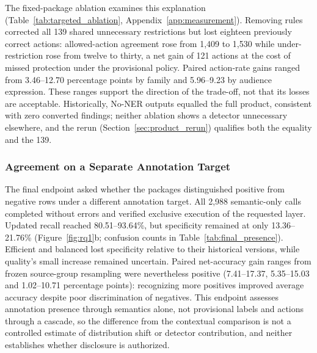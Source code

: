 \documentclass[sigconf]{acmart}
\theoremstyle{acmdefinition}\newtheorem{property}{Property}
\begin{document}
\label{sec:detector_ablation}
The fixed-package ablation examines this explanation (Table~\ref{tab:targeted_ablation}, Appendix~\ref{app:measurement}). Removing rules corrected all 139 shared unnecessary restrictions but lost eighteen previously correct actions: allowed-action agreement rose from 1,409 to 1,530 while under-restriction rose from twelve to thirty, a net gain of 121 actions at the cost of missed protection under the provisional policy. Paired action-rate gains ranged from 3.46--12.70 percentage points by family and 5.96--9.23 by audience expression. These ranges support the direction of the trade-off, not that its losses are acceptable. Historically, No-NER outputs equalled the full product, consistent with zero converted findings; neither ablation shows a detector unnecessary elsewhere, and the rerun (Section~\ref{sec:product_rerun}) qualifies both the equality and the 139.

\subsubsection{Agreement on a Separate Annotation Target}
\label{sec:final_annotation}
The final endpoint asked whether the packages distinguished positive from negative rows under a different annotation target. All 2,988 semantic-only calls completed without errors and verified exclusive execution of the requested layer. Updated recall reached 80.51--93.64\%, but specificity remained at only 13.36--21.76\% (Figure~\ref{fig:rq1}b; confusion counts in Table~\ref{tab:final_presence}). Efficient and balanced lost specificity relative to their historical versions, while quality's small increase remained uncertain. Paired net-accuracy gain ranges from frozen source-group resampling were nevertheless positive (7.41--17.37, 5.35--15.03 and 1.02--10.71 percentage points): recognizing more positives improved average accuracy despite poor discrimination of negatives. This endpoint assesses annotation presence through semantics alone, not provisional labels and actions through a cascade, so the difference from the contextual comparison is not a controlled estimate of distribution shift or detector contribution, and neither establishes whether disclosure is authorized.
\end{document}
